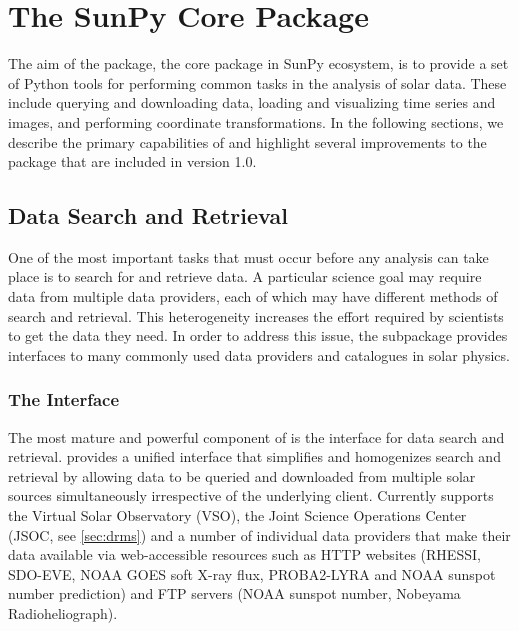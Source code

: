 \section{The SunPy Core Package}
\label{sec:sunpycore}

The aim of the \sunpypkg package, the core package in SunPy ecosystem, is to provide a set of Python tools for performing common tasks in the analysis of solar data. These include querying and downloading data, loading and visualizing time series and images, and performing coordinate transformations. In the following sections, we describe the primary capabilities of \sunpypkg and highlight several improvements to the package that are included in version 1.0. 

\subsection{Data Search and Retrieval}
\label{sec:fido}

One of the most important tasks that must occur before any analysis can take place is to search for and retrieve data.
A particular science goal may require data from multiple data providers, each of which may have different methods of search and retrieval.
This heterogeneity increases the effort required by scientists to get the data they need.
In order to address this issue, the  subpackage provides interfaces to many commonly used data providers and catalogues in solar physics. 

\subsubsection{The \Fido Interface}
\label{sec:fido}

The most mature and powerful component of  is the \Fido interface for data search and retrieval.
\Fido provides a unified interface that simplifies and homogenizes search and retrieval by allowing data to be queried and downloaded from multiple solar sources simultaneously irrespective of the underlying client.
Currently \Fido supports the Virtual Solar Observatory (VSO), the Joint Science Operations Center (JSOC, see \autoref{sec:drms}) and a number of individual data providers that make their data available via web-accessible resources such as HTTP websites (RHESSI, SDO-EVE, NOAA GOES soft X-ray flux, PROBA2-LYRA and NOAA sunspot number prediction) and FTP servers (NOAA sunspot number, Nobeyama Radioheliograph).

